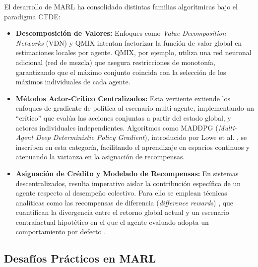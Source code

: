 El desarrollo de MARL ha consolidado distintas familias algorítmicas bajo el paradigma CTDE:
\begin{itemize}
    \item \textbf{Descomposición de Valores:} Enfoques como \textit{Value Decomposition Networks} (VDN) \cite{vdn} y QMIX \cite{qmix} intentan factorizar la función de valor global en estimaciones locales por agente. QMIX, por ejemplo, utiliza una red neuronal adicional (red de mezcla) que asegura restricciones de monotonía, garantizando que el máximo conjunto coincida con la selección de los máximos individuales de cada agente.
    \item \textbf{Métodos Actor-Crítico Centralizados:} Esta vertiente extiende los enfoques de gradiente de política al escenario multi-agente, implementando un ``crítico'' que evalúa las acciones conjuntas a partir del estado global, y actores individuales independientes. Algoritmos como MADDPG (\textit{Multi-Agent Deep Deterministic Policy Gradient}), introducido por Lowe et al. \cite{maddpg}, se inscriben en esta categoría, facilitando el aprendizaje en espacios continuos y atenuando la varianza en la asignación de recompensas.
    \item \textbf{Asignación de Crédito y Modelado de Recompensas:} En sistemas descentralizados, resulta imperativo aislar la contribución específica de un agente respecto al desempeño colectivo. Para ello se emplean técnicas analíticas como las recompensas de diferencia (\textit{difference rewards}) \cite{difference_rewards}, que cuantifican la divergencia entre el retorno global actual y un escenario contrafactual hipotético en el que el agente evaluado adopta un comportamiento por defecto \cite{coma}.
\end{itemize}

\subsection{Desafíos Prácticos en MARL}

